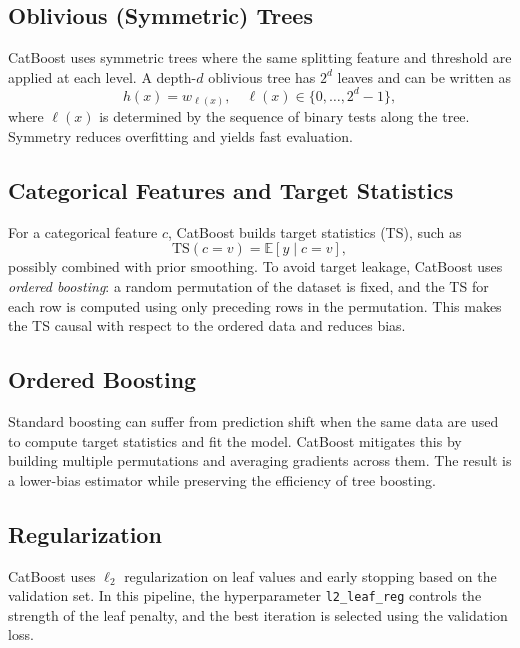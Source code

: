 \documentclass[11pt]{article}
\begin{document}
\subsection*{Oblivious (Symmetric) Trees}

CatBoost uses symmetric trees where the same splitting feature and threshold are
applied at each level. A depth-$d$ oblivious tree has $2^d$ leaves and can be
written as
\[
h(x) = w_{\ell(x)}, \quad \ell(x) \in \{0,\dots,2^d-1\},
\]
where $\ell(x)$ is determined by the sequence of binary tests along the tree.
Symmetry reduces overfitting and yields fast evaluation.

\subsection*{Categorical Features and Target Statistics}

For a categorical feature $c$, CatBoost builds target statistics (TS), such as
\[
\text{TS}(c=v) = \mathbb{E}[y \mid c=v],
\]
possibly combined with prior smoothing. To avoid target leakage, CatBoost uses
\emph{ordered boosting}: a random permutation of the dataset is fixed, and the TS
for each row is computed using only preceding rows in the permutation. This
makes the TS causal with respect to the ordered data and reduces bias.

\subsection*{Ordered Boosting}

Standard boosting can suffer from prediction shift when the same data are used
to compute target statistics and fit the model. CatBoost mitigates this by
building multiple permutations and averaging gradients across them. The result
is a lower-bias estimator while preserving the efficiency of tree boosting.

\subsection*{Regularization}

CatBoost uses $\ell_2$ regularization on leaf values and early stopping based on
the validation set. In this pipeline, the hyperparameter
\texttt{l2\_leaf\_reg} controls the strength of the leaf penalty, and the best
iteration is selected using the validation loss.
\end{document}
